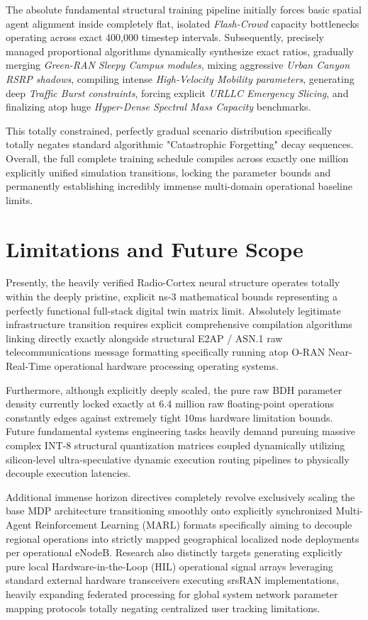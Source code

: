 \documentclass[12pt,a4paper]{article}
\begin{document}
The absolute fundamental structural training pipeline initially forces basic spatial agent alignment inside completely flat, isolated \textit{Flash-Crowd} capacity bottlenecks operating across exact 400,000 timestep intervals. Subsequently, precisely managed proportional algorithms dynamically synthesize exact ratios, gradually merging \textit{Green-RAN Sleepy Campus modules}, mixing aggressive \textit{Urban Canyon RSRP shadows}, compiling intense \textit{High-Velocity Mobility parameters}, generating deep \textit{Traffic Burst constraints}, forcing explicit \textit{URLLC Emergency Slicing}, and finalizing atop huge \textit{Hyper-Dense Spectral Mass Capacity} benchmarks. 

This totally constrained, perfectly gradual scenario distribution specifically totally negates standard algorithmic "Catastrophic Forgetting" decay sequences. Overall, the full complete training schedule compiles across exactly one million explicitly unified simulation transitions, locking the parameter bounds and permanently establishing incredibly immense multi-domain operational baseline limits.

\section{Limitations and Future Scope}

Presently, the heavily verified Radio-Cortex neural structure operates totally within the deeply pristine, explicit ns-3 mathematical bounds representing a perfectly functional full-stack digital twin matrix limit. Absolutely legitimate infrastructure transition requires explicit comprehensive compilation algorithms linking directly exactly alongside structural E2AP / ASN.1 raw telecommunications message formatting specifically running atop O-RAN Near-Real-Time operational hardware processing operating systems.

Furthermore, although explicitly deeply scaled, the pure raw BDH parameter density currently locked exactly at 6.4 million raw floating-point operations constantly edges against extremely tight 10ms hardware limitation bounds. Future fundamental systems engineering tasks heavily demand pursuing massive complex INT-8 structural quantization matrices coupled dynamically utilizing silicon-level ultra-speculative dynamic execution routing pipelines to physically decouple execution latencies.

Additional immense horizon directives completely revolve exclusively scaling the base MDP architecture transitioning smoothly onto explicitly synchronized Multi-Agent Reinforcement Learning (MARL) formats specifically aiming to decouple regional operations into strictly mapped geographical localized node deployments per operational eNodeB. Research also distinctly targets generating explicitly pure local Hardware-in-the-Loop (HIL) operational signal arrays leveraging standard external hardware transceivers executing srsRAN implementations, heavily expanding federated processing for global system network parameter mapping protocols totally negating centralized user tracking limitations.
\end{document}
